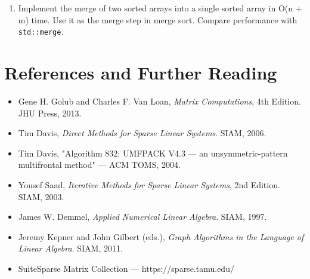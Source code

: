 \begin{enumerate}
\item Implement the merge of two sorted arrays into a single sorted array in O(n + m) time. Use it as the merge step in merge sort. Compare performance with \texttt{std::merge}.
\end{enumerate}

\section{References and Further Reading}

\begin{itemize}
\item Gene H. Golub and Charles F. Van Loan, \textit{Matrix Computations}, 4th Edition. JHU Press, 2013.
\item Tim Davis, \textit{Direct Methods for Sparse Linear Systems}. SIAM, 2006.
\item Tim Davis, "Algorithm 832: UMFPACK V4.3 — an unsymmetric-pattern multifrontal method" — ACM TOMS, 2004.
\item Yousef Saad, \textit{Iterative Methods for Sparse Linear Systems}, 2nd Edition. SIAM, 2003.
\item James W. Demmel, \textit{Applied Numerical Linear Algebra}. SIAM, 1997.
\item Jeremy Kepner and John Gilbert (eds.), \textit{Graph Algorithms in the Language of Linear Algebra}. SIAM, 2011.
\item SuiteSparse Matrix Collection — https://sparse.tamu.edu/
\end{itemize}

